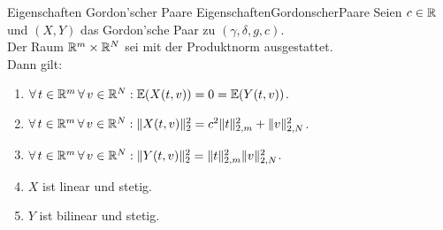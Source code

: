 \begin{lemma}{Eigenschaften Gordon'scher Paare}
             {EigenschaftenGordonscherPaare}
Seien $c \in \mathbb{R}$ und $(X, Y)$ das Gordon'sche Paar zu $(\gamma, \delta,g,c)$.\\
Der Raum $\mathbb{R}^m \times \mathbb{R}^N$ sei mit der Produktnorm ausgestattet.\\
Dann gilt:
\begin{enumerate}[(1)]
	\item \label{EigenschaftenGordonscherPaare1}
	$\forall\, t \in \mathbb{R}^m\, \forall\, v \in \mathbb{R}^N:
	\mathbb{E}(X(t,v)) = 0 = \mathbb{E}(Y(t,v))$.
	\item \label{EigenschaftenGordonscherPaare2}
	$\forall\, t \in \mathbb{R}^m\, \forall\, v \in \mathbb{R}^N: \lVert X(t,v)\rVert_2^2 
	= c^2\lVert t\rVert _{2,m}^2 + \lVert v\rVert _{2, N}^2$.
	\item \label{EigenschaftenGordonscherPaare3}
	$\forall\, t \in \mathbb{R}^m\, \forall\, v\in \mathbb{R}^N:
	\lVert Y(t, v)\rVert_2^2 = \lVert t\rVert_{2,m}^2\lVert v\rVert_{2, N}^2$.
	\item \label{EigenschaftenGordonscherPaare4}
	$X$ ist linear und stetig.
	\item\label{EigenschaftenGordonscherPaare5}
	$Y$ ist bilinear und stetig.
\end{enumerate}
\end{lemma}
